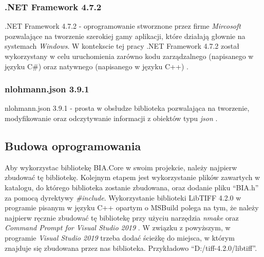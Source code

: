 \documentclass{article}
\begin{document}
        \subsubsection{.NET Framework 4.7.2}
        {
            \label{sec:.NETFramework 4.7.2}
            \Large
            \justifying
            \quad
            .NET Framework 4.7.2 - oprogramowanie stworznone przez firme \textit{Mircosoft} pozwalające na
            tworzenie szerokiej gamy aplikacji, które działają głownie na systemach \textit{Windows}.
            W kontekscie tej pracy .NET Framework 4.7.2 został wykorzystany w celu uruchomienia zarówno kodu zarządzalnego (napisanego w języku C\#)
            oraz natywnego (napisanego w języku C++) \cite{.NET Framework}.
        }
        \subsubsection{nlohmann.json 3.9.1}
        {
            \label{sec:nlohman.json 3.9.1}
            \Large
            \justifying
            \quad
            nlohmann.json 3.9.1 - prosta w obsłudze biblioteka pozwalająca na tworzenie, modyfikowanie oraz odczytywanie informacji
            z obiektów typu \textit{json} \cite{nlohmann.json 3.9.1}.
        }
        \subsection{Budowa oprogramowania}
        {
            \Large
            \justifying
            \quad
            Aby wykorzystac bibliotekę BIA.Core w swoim projekcie, należy najpierw zbudować tę bibliotekę.
            Kolejnym etapem jest wykorzystanie plików zawartych w katalogu, do którego biblioteka zostanie zbudowana,
            oraz dodanie pliku ``BIA.h'' za pomocą dyrektywy \textit{\#include}.
            Wykorzystanie biblioteki LibTIFF 4.2.0 w programie pisanym w języku C++ opartym o MSBuild polega na tym, że należy najpierw ręcznie zbudować tę bibliotekę przy użyciu narzędzia \textit{nmake} oraz \textit{Command Prompt for Visual Studio 2019} \cite{Biblioteka LibTIFF}.
            W związku z powyższym, w programie \textit{Visual Studio 2019} trzeba dodać ścieżkę do miejsca, w którym znajduje się zbudowana przez nas biblioteka.
            Przykładowo ``D:/tiff-4.2.0/libtiff''.
        }
\end{document}
